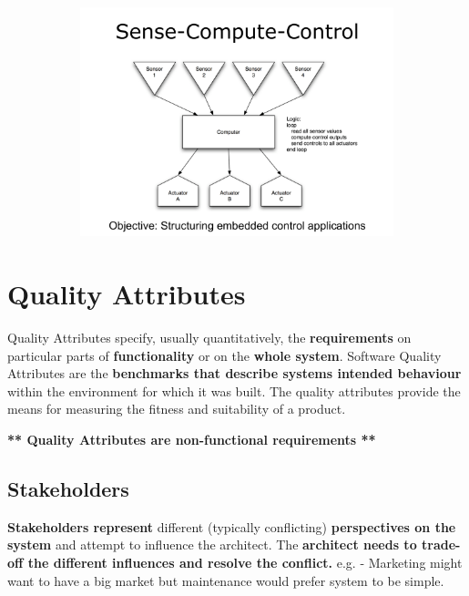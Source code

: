 \documentclass[a4paper]{article}
\begin{document}
\begin{figure}[H]
\hskip-2.5cm\begin{subfigure}{1.2\textwidth}
  \includegraphics[width=1.2\linewidth]
  {images/3-sense-compute-control.png}
\end{subfigure}
\end{figure}
\newpage

\section{Quality Attributes}

Quality Attributes specify, usually quantitatively, the \textbf{requirements} on particular parts of \textbf{functionality} or on the \textbf{whole system}. Software Quality Attributes are the \textbf{benchmarks that describe systems intended behaviour} within the environment for which it was built. The quality attributes provide the means for measuring the fitness and suitability of a product.

\textbf{** Quality Attributes are non-functional requirements **}

\subsection{Stakeholders}
\textbf{Stakeholders represent} different (typically conflicting) \textbf{perspectives on the system} and attempt to influence the architect. The \textbf{architect needs to trade-off the different influences and resolve the conflict.} e.g. - Marketing might want to have a big market but maintenance would prefer system to be simple.
\end{document}

